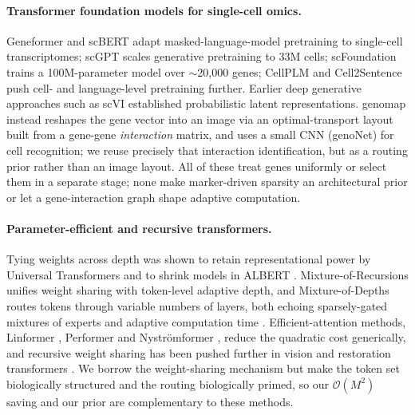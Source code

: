 \documentclass[letterpaper]{article}
\begin{document}
\paragraph{Transformer foundation models for single-cell omics.}
Geneformer \cite{theodoris2023transfer} and scBERT \cite{yang2022scbert} adapt
masked-language-model pretraining to single-cell transcriptomes; scGPT
\cite{cui2024scgpt} scales generative pretraining to 33M cells; scFoundation
\cite{hao2024large} trains a 100M-parameter model over $\sim$20{,}000 genes; CellPLM
\cite{wen2024cellplm} and Cell2Sentence \cite{levine2024cell2sentence} push cell- and
language-level pretraining further. Earlier deep generative approaches such as scVI
\cite{lopez2018deep} established probabilistic latent representations. genomap
\cite{islam2023cartography} instead reshapes the gene vector into an image via an
optimal-transport layout built from a gene-gene \emph{interaction} matrix, and uses a
small CNN (genoNet) for cell recognition; we reuse precisely that interaction
identification, but as a routing prior rather than an image layout. All of these
treat genes uniformly or select them in a separate stage; none make marker-driven
sparsity an architectural prior or let a gene-interaction graph shape adaptive
computation.

\paragraph{Parameter-efficient and recursive transformers.}
Tying weights across depth was shown to retain representational power by Universal
Transformers \cite{dehghani2019universal} and to shrink models in ALBERT
\cite{lan2020albert}. Mixture-of-Recursions \cite{bae2025mixture} unifies weight
sharing with token-level adaptive depth, and Mixture-of-Depths \cite{raposo2024mixture}
routes tokens through variable numbers of layers, both echoing sparsely-gated mixtures
of experts \cite{shazeer2017outrageously} and adaptive computation time
\cite{graves2016adaptive}. Efficient-attention methods, Linformer
\cite{wang2020linformer}, Performer \cite{choromanski2021rethinking} and
Nystr\"omformer \cite{xiong2021nystromformer}, reduce the quadratic cost generically,
and recursive weight sharing has been pushed further in vision and restoration transformers
\cite{shen2021sliced,jaber2026ouroboros}. We borrow the weight-sharing mechanism but make
the token set biologically structured and the routing biologically primed, so our
$\mathcal{O}(M^2)$ saving and our prior are complementary to these methods.
\end{document}
